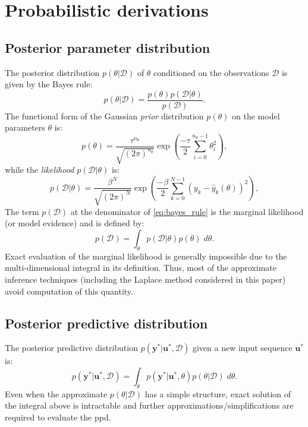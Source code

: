 \documentclass{ifacconf}
\newcommand{\nsamp}{N}
\newcommand{\npar}{{n_\theta}}
\newcommand{\tvec}[1]{{\mathbf{#1}}}
\newcommand{\mean}[1]{\hat{#1}}
\newcommand{\D}{\mathcal{D}} %
\begin{document}
\section{Probabilistic derivations}
\subsection{Posterior parameter distribution}
The  posterior distribution $p(\theta |  \D)$ of $\theta$ conditioned on the observations $\D$ is given by the Bayes rule:
\begin{equation}
\label{eq:bayes_rule}
p(\theta |  \D) = \frac{p(\theta) p(\D|\theta)}{p(\D)}.
\end{equation}
The functional form of the Gaussian \emph{prior} distribution $p(\theta)$ on the model parameters $\theta$ is:
\begin{equation}
\label{eq:theta_prior}
p(\theta) = \frac{\tau^\npar}{\sqrt{(2\pi)^{\npar} }} \exp\left(\frac{-\tau}{2} \sum_{i=0}^{\npar-1} \theta_i^2\right),
\end{equation}
while the \emph{likelihood} $p(\mathcal{D}|\theta)$ is:
\begin{equation}
\label{eq:likelihood}
p(\mathcal{D}|\theta) = \frac{\beta^\nsamp}{\sqrt{(2\pi)^{\nsamp} }} \exp\left(\frac{-\beta}{2}\sum_{k=0}^{\nsamp-1}{(y_k - \mean{y}_k(\theta))^2}\right),
\end{equation}
The term $p(\D)$ at the denominator of \eqref{eq:bayes_rule} is the marginal likelihood (or model evidence) and is defined by:
\begin{equation}
\label{eq:marginal_likelihood}
p(\D) = \int_{\theta} {p(\D|\theta) p(\theta)} \; d\theta. 
\end{equation}
Exact evaluation of the marginal likelihood is generally impossible due to the multi-dimensional integral in its definition. 
Thus, most of the approximate inference techniques (including the Laplace method considered in this paper) avoid computation of this quantity.

\subsection{Posterior predictive distribution}
The posterior predictive distribution $p(\tvec{y}^* | \tvec{u}^*, \D)$ given a new input sequence $\tvec{u}^*$ is:%
\begin{equation}
\label{eq:posterior_predictive}
p(\tvec{y}^* | \tvec{u}^*, \D) = \int_{\theta} p(\tvec{y}^* | \tvec{u}^*, \theta) p(\theta | \D) \; d\theta.
\end{equation}
Even when the approximate $p(\theta | \D)$ has a simple structure, exact solution of the integral above is intractable and further approximations/simplifications are required to evaluate the ppd.
\end{document}
